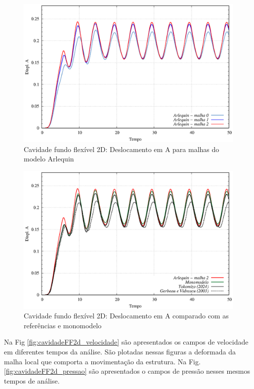 \documentclass[tese_patricia]{subfiles}
\begin{document}
\begin{figure}[htb!]
	\centering 
	\includegraphics[scale=1.0,trim=0cm 0cm 0cm 0cm, clip=true]{Imagens/Cap7/Cav2dDisplacementArlq.eps}	
	\caption{Cavidade fundo flexível 2D: Deslocamento em A para malhas do modelo Arlequin}
	\label{fig:cavidadeFF2d_DeslocamentoArlq}
\end{figure}

\begin{figure}[htb!]
	\centering 
	\includegraphics[scale=1.0,trim=0cm 0cm 0cm 0cm, clip=true]{Imagens/Cap7/Cav2dDisplacementArlqMono.eps}	
	\caption{Cavidade fundo flexível 2D: Deslocamento em A comparado com as referências e monomodelo}
	\label{fig:cavidadeFF2d_DeslocamentoA1}
\end{figure}

Na Fig \ref{fig:cavidadeFF2d_velocidade} são apresentados os campos de velocidade em diferentes tempos da análise. São plotadas nessas figuras a deformada da malha local que comporta a movimentação da estrutura. Na Fig. \ref{fig:cavidadeFF2d_pressao} são apresentados o campos de pressão nesses mesmos tempos de análise.
\end{document}
